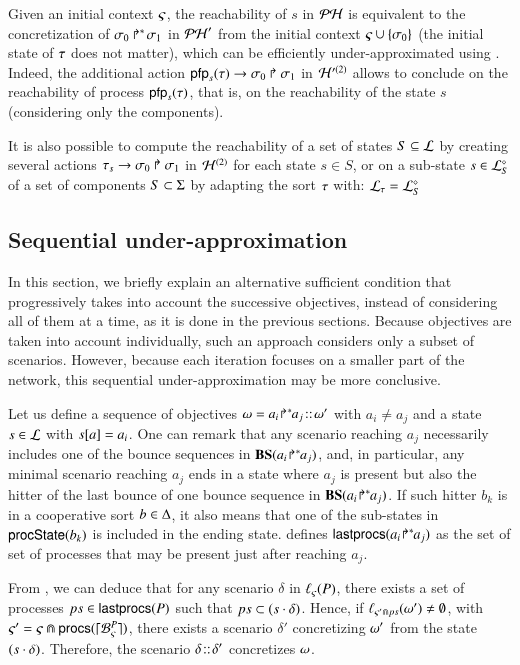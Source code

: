 Given an initial context $\ctx$, the reachability of $s$ in $\PH$ is equivalent to the concretization of $\PHobjp{\reach}{0}{1}$ in $\PH'$ from the initial context $\ctx \cup \{ \reach_0 \}$ (the initial state of $\total$ does not matter), which can be efficiently under-approximated using .
Indeed, the additional action $\PHhit{\pfp_s(\total)}{\reach_0}{\reach_1}$ in $\PHh'^{(2)}$ allows to conclude on the reachability of process $\pfp_s(\total)$, that is, on the reachability of the state $s$ (considering only the components).

It is also possible to compute the reachability of a set of states $S \subseteq \PHl$ by creating several actions $\PHhit{\total_s}{\reach_0}{\reach_1}$ in $\PHh^{(2)}$ for each state $s \in S$,
or on a sub-state $s \in \PHsubl[\PHl]_S$ of a set of components $S \subset \PHs$ by adapting the sort $\total$ with: $\PHl_\total = \PHsubl[\PHl]_S$


\subsection{Sequential under-approximation}
\label{ssec:ordered-ua}

In this section, we briefly explain an alternative sufficient condition that
progressively takes into account the successive objectives, instead of
considering all of them at a time, as it is done in the previous sections.
Because objectives are taken into account individually, such an approach
considers only a subset of scenarios.
However, because each iteration focuses on a smaller part of the network, this
sequential under-approximation may be more conclusive.

Let us define a sequence of objectives $\w=\obj{a_i}{a_j}\concat\w'$ with
$a_i\neq a_j$ and a state $s\in \PHl$ with $\get{s}{a}=a_i$.
One can remark that any scenario reaching $a_j$ necessarily includes one of the
bounce sequences in $\BS(\obj{a_i}{a_j})$, and, in particular,
any minimal scenario reaching $a_j$ ends in a state where $a_j$ is present but
also the hitter of the last bounce of one bounce sequence in $\BS(\obj{a_i}{a_j})$.
If such hitter $b_k$ is in a cooperative sort $b\in\cs$, it also means that one of the sub-states
in $\csState(b_k)$ is included in the ending state.
 defines $\lastprocs(\obj{a_i}{a_j})$ as the set of set of
processes that may be present just after reaching $a_j$.

From , we can deduce that
for any scenario $\delta$ in $\uconcr(P)$,
there exists a set of processes $ps\in\lastprocs(P)$
such that $ps \subset (s\play\delta)$.
Hence, if $\muconcr_{\ctx'\Cap ps}(\w')\neq\emptyset$,
with $\ctx'=\ctx\Cap\procs(\mycwB{\ctx}{P})$,
there exists a scenario $\delta'$ concretizing $\w'$ from the
state $(s\play\delta)$.
Therefore, the scenario $\delta\concat\delta'$ concretizes
$\w$.

